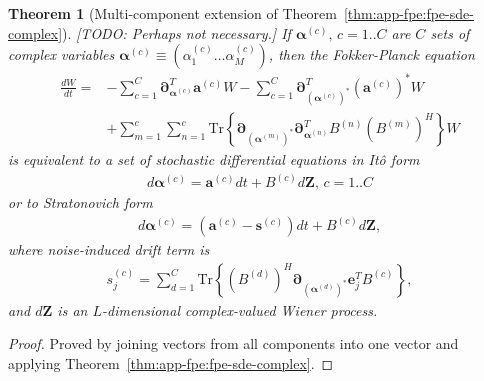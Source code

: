 \documentclass[12pt,aip,jmp,amssymb,amsmath]{revtex4-1}
\newtheorem{theorem}{Theorem}
\begin{document}
\begin{theorem}[Multi-component extension of Theorem~\ref{thm:app-fpe:fpe-sde-complex}]
\label{thm:app-fpe:mc-fpe-sde}
    [TODO: Perhaps not necessary.]
    If $\boldsymbol{\alpha}^{(c)},\, c = 1..C$ are $C$ sets of complex variables $\boldsymbol{\alpha}^{(c)} \equiv (\alpha_1^{(c)} \ldots \alpha_M^{(c)})$, then the Fokker-Planck equation
    \begin{eqnarray}
        \frac{dW}{dt}
        = & - \sum_{c=1}^C \boldsymbol{\partial}_{\boldsymbol{\alpha}^{(c)}}^T \boldsymbol{a}^{(c)} W
        - \sum_{c=1}^C \boldsymbol{\partial}_{(\boldsymbol{\alpha}^{(c)})^*}^T (\boldsymbol{a}^{(c)})^* W \\
        & + \sum_{m=1}^c \sum_{n=1}^c
            \mathrm{Tr} \left\{
                \boldsymbol{\partial}_{(\boldsymbol{\alpha}^{(m)})^*}
                \boldsymbol{\partial}_{\boldsymbol{\alpha}^{(n)}}^T
                B^{(n)} (B^{(m)})^H
            \right\} W
    \end{eqnarray}
    is equivalent to a set of stochastic differential equations in It\^{o} form
    \begin{eqnarray}
        d\boldsymbol{\alpha}^{(c)} = \boldsymbol{a}^{(c)} dt + B^{(c)} d\boldsymbol{Z},\, c = 1..C
    \end{eqnarray}
    or to Stratonovich form
    \begin{eqnarray*}
        d\boldsymbol{\alpha}^{(c)} = (\boldsymbol{a}^{(c)} - \boldsymbol{s}^{(c)}) dt + B^{(c)} d\boldsymbol{Z},
    \end{eqnarray*}
    where noise-induced drift term is
    \begin{eqnarray*}
        s_j^{(c)} = \sum_{d=1}^C
            \mathrm{Tr} \left\{ (B^{(d)})^H \boldsymbol{\partial}_{(\boldsymbol{\alpha}^{(d)})^*} \boldsymbol{e}_j^T B^{(c)} \right\},
    \end{eqnarray*}
    and $d\boldsymbol{Z}$ is an $L$-dimensional complex-valued Wiener process.
\end{theorem}
\begin{proof}
Proved by joining vectors from all components into one vector and applying Theorem~\ref{thm:app-fpe:fpe-sde-complex}.
\end{proof}
\end{document}
